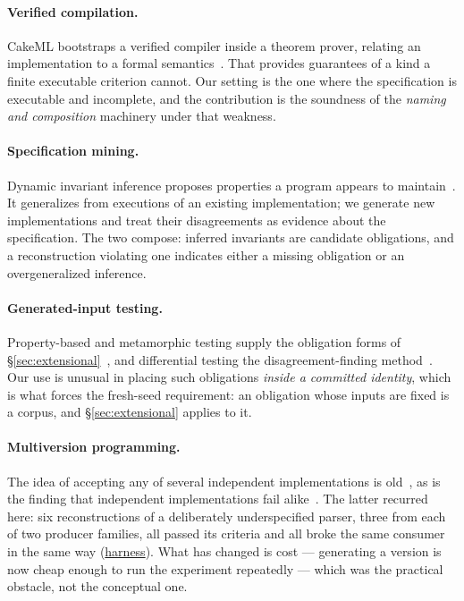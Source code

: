 \documentclass[10pt,twocolumn,letterpaper]{article}
\newcommand{\art}[2]{\href{https://github.com/rz4/reticuli/blob/5318acaac34ef99eeba9ff064a995a6313cc70ec/#1}{#2}}
\begin{document}
\paragraph{Verified compilation.} CakeML bootstraps a verified compiler inside a theorem prover, relating an implementation to a formal semantics~\cite{cakeml}. That provides guarantees of a kind a finite executable criterion cannot. Our setting is the one where the specification is executable and incomplete, and the contribution is the soundness of the \emph{naming and composition} machinery under that weakness.

\paragraph{Specification mining.} Dynamic invariant inference proposes properties a program appears to maintain~\cite{daikon}. It generalizes from executions of an existing implementation; we generate new implementations and treat their disagreements as evidence about the specification. The two compose: inferred invariants are candidate obligations, and a reconstruction violating one indicates either a missing obligation or an overgeneralized inference.

\paragraph{Generated-input testing.} Property-based and metamorphic testing supply the obligation forms of §\ref{sec:extensional}~\cite{quickcheck,metamorphic}, and differential testing the disagreement-finding method~\cite{csmith}. Our use is unusual in placing such obligations \emph{inside a committed identity}, which is what forces the fresh-seed requirement: an obligation whose inputs are fixed is a corpus, and §\ref{sec:extensional} applies to it.

\paragraph{Multiversion programming.} The idea of accepting any of several independent implementations is old~\cite{avizienis}, as is the finding that independent implementations fail alike~\cite{knight}. The latter recurred here: six reconstructions of a deliberately underspecified parser, three from each of two producer families, all passed its criteria and all broke the same consumer in the same way (\art{research/harness/substitution}{harness}). What has changed is cost --- generating a version is now cheap enough to run the experiment repeatedly --- which was the practical obstacle, not the conceptual one.
\end{document}
